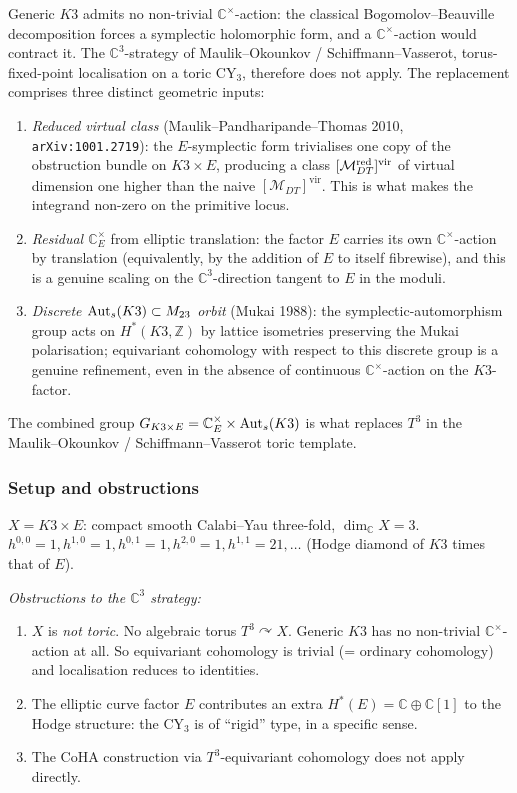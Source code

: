 \begin{remark}
\label{wn:rem:K3xE-no-torus-replaced}
Generic $K3$ admits no non-trivial $\mathbb{C}^\times$-action: the classical
Bogomolov--Beauville decomposition forces a symplectic holomorphic form, and a
$\mathbb{C}^\times$-action would contract it. The $\mathbb{C}^3$-strategy of
Maulik--Okounkov / Schiffmann--Vasserot, torus-fixed-point localisation on a toric
CY$_3$, therefore does not apply. The replacement comprises three distinct
geometric inputs:
\begin{enumerate}
\item \emph{Reduced virtual class} (Maulik--Pandharipande--Thomas 2010,
\texttt{arXiv:1001.2719}): the $E$-symplectic form trivialises one copy of the
obstruction bundle on $K3 \times E$, producing a class $[\mathcal{M}^{\mathrm{red}}_{DT}]^{\mathrm{vir}}$ of
virtual dimension one higher than the naive $[\mathcal{M}_{DT}]^{\mathrm{vir}}$. This
is what makes the integrand non-zero on the primitive locus.
\item \emph{Residual $\mathbb{C}^\times_E$} from elliptic translation: the factor $E$
carries its own $\mathbb{C}^\times$-action by translation (equivalently, by the
addition of $E$ to itself fibrewise), and this is a genuine scaling on the
$\mathbb{C}^3$-direction tangent to $E$ in the moduli.
\item \emph{Discrete $\mathrm{Aut}_s(K3) \subset M_{23}$ orbit} (Mukai 1988): the
symplectic-automorphism group acts on $H^*(K3, \mathbb{Z})$ by lattice isometries
preserving the Mukai polarisation; equivariant cohomology with respect to this
discrete group is a genuine refinement, even in the absence of continuous
$\mathbb{C}^\times$-action on the $K3$-factor.
\end{enumerate}
The combined group $G_{K3 \times E} = \mathbb{C}^\times_E \times \mathrm{Aut}_s(K3)$ is what
replaces $T^3$ in the Maulik--Okounkov / Schiffmann--Vasserot toric template.
\end{remark}

\subsubsection{Setup and obstructions}

$X = K3 \times E$: compact smooth Calabi--Yau three-fold, $\dim_\mathbb{C} X = 3$.
$h^{0, 0} = 1, h^{1, 0} = 1, h^{0, 1} = 1, h^{2, 0} = 1, h^{1, 1} = 21,\ldots$
(Hodge diamond of $K3$ times that of $E$).

\emph{Obstructions to the $\mathbb{C}^3$ strategy:}
\begin{enumerate}
\item $X$ is \emph{not toric}. No algebraic torus $T^3 \curvearrowright X$.
Generic $K3$ has no non-trivial $\mathbb{C}^\times$-action at all. So equivariant
cohomology is trivial (= ordinary cohomology) and localisation reduces to identities.
\item The elliptic curve factor $E$ contributes an extra $H^*(E) = \mathbb{C} \oplus
\mathbb{C}[1]$ to the Hodge structure: the CY$_3$ is of ``rigid'' type, in a specific
sense.
\item The CoHA construction via $T^3$-equivariant cohomology does not apply directly.
\end{enumerate}

